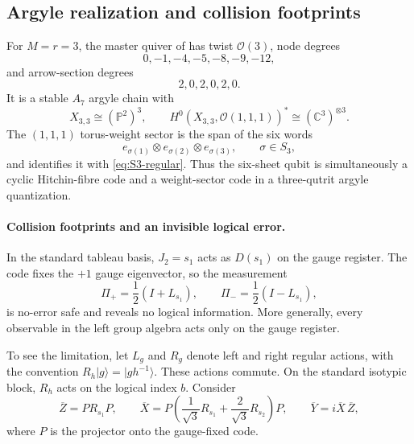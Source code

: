 \documentclass[11pt]{article}
\theoremstyle{definition}
\theoremstyle{remark}
\newcommand{\C}{\mathbb C}
\newcommand{\Pp}{\mathbb P}
\newcommand{\cO}{\mathcal O}
\newcommand{\ket}[1]{\lvert #1\rangle}
\begin{document}
\subsection{Argyle realization and collision footprints}

For $M=r=3$, the master quiver of  has twist $\cO(3)$, node degrees
\begin{equation}\label{eq:A7-degrees}
 0,-1,-4,-5,-8,-9,-12,
\end{equation}
and arrow-section degrees
\[
 2,0,2,0,2,0.
\]
It is a stable $A_7$ argyle chain with
\begin{equation}\label{eq:A7-master}
 X_{3,3}\cong(\Pp^2)^3,
 \qquad
 H^0(X_{3,3},\cO(1,1,1))^*\cong(\C^3)^{\otimes3}.
\end{equation}
The $(1,1,1)$ torus-weight sector is the span of the six words
\[
 e_{\sigma(1)}\otimes e_{\sigma(2)}\otimes e_{\sigma(3)},
 \qquad \sigma\in S_3,
\]
and  identifies it with \eqref{eq:S3-regular}.  Thus the six-sheet qubit is simultaneously a cyclic Hitchin-fibre code and a weight-sector code in a three-qutrit argyle quantization.

\paragraph{Collision footprints and an invisible logical error.}

In the standard tableau basis, $J_2=s_1$ acts as $D(s_1)$ on the gauge register.  The code fixes the $+1$ gauge eigenvector, so the measurement
\begin{equation}\label{eq:S3-footprint-projectors}
 \Pi_+=\frac12(I+L_{s_1}),
 \qquad
 \Pi_-=\frac12(I-L_{s_1}),
\end{equation}
is no-error safe and reveals no logical information.  More generally, every observable in the left group algebra acts only on the gauge register.

To see the limitation, let $L_g$ and $R_g$ denote left and right regular actions, with the convention $R_h\ket g=\ket{gh^{-1}}$.  These actions commute.  On the standard isotypic block, $R_h$ acts on the logical index $b$.  Consider
\begin{equation}\label{eq:logical-paulis-right-action}
 \overline Z=PR_{s_1}P,
 \qquad
 \overline X
 =P\left(\frac1{\sqrt3}R_{s_1}
          +\frac2{\sqrt3}R_{s_2}\right)P,
 \qquad
 \overline Y=i\overline X\,\overline Z,
\end{equation}
where $P$ is the projector onto the gauge-fixed code.
\end{document}

